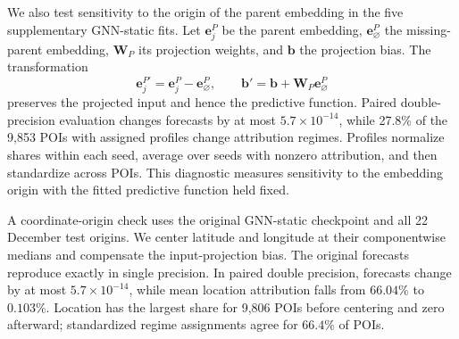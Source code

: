 \documentclass[preprint,authoryear,11pt]{elsarticle}
\theoremstyle{definition}
\begin{document}
We also test sensitivity to the origin of the parent embedding in the five supplementary GNN-static fits. Let \(\mathbf e_j^{P}\) be the parent embedding, \(\mathbf e_{\varnothing}^{P}\) the missing-parent embedding, \(\mathbf W_P\) its projection weights, and \(\mathbf b\) the projection bias. The transformation
\[
\mathbf e_j^{P\prime}=\mathbf e_j^{P}-\mathbf e_{\varnothing}^{P},
\qquad
\mathbf b'=\mathbf b+\mathbf W_P\mathbf e_{\varnothing}^{P}
\]
preserves the projected input and hence the predictive function. Paired double-precision evaluation changes forecasts by at most \(5.7\times10^{-14}\), while 27.8\% of the 9,853 POIs with assigned profiles change attribution regimes. Profiles normalize shares within each seed, average over seeds with nonzero attribution, and then standardize across POIs. This diagnostic measures sensitivity to the embedding origin with the fitted predictive function held fixed.

A coordinate-origin check uses the original GNN-static checkpoint and all 22 December test origins. We center latitude and longitude at their componentwise medians and compensate the input-projection bias. The original forecasts reproduce exactly in single precision. In paired double precision, forecasts change by at most \(5.7\times10^{-14}\), while mean location attribution falls from \(66.04\%\) to \(0.103\%\). Location has the largest share for 9,806 POIs before centering and zero afterward; standardized regime assignments agree for \(66.4\%\) of POIs.
\par
\endgroup

\newpage
\begingroup
\singlespacing


\endgroup
\end{document}
